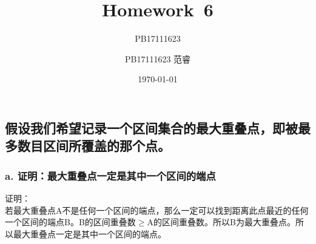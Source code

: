 \documentclass[UTF8]{ctexart}
\title{Homework\ 6}
\author{PB17111623}
\author{PB17111623 范睿}
\date{\today}
\begin{document}
\maketitle
\section{}
\subsection{假设我们希望记录一个区间集合的最大重叠点，即被最多数目区间所覆盖的那个点。}
\subsubsection{a. 证明：最大重叠点一定是其中一个区间的端点}
证明：\\
若最大重叠点A不是任何一个区间的端点，那么一定可以找到距离此点最近的任何一个区间的端点B。B的区间重叠数$\geq$A的区间重叠数。所以B为最大重叠点。所以最大重叠点一定是其中一个区间的端点。
\end{document}
